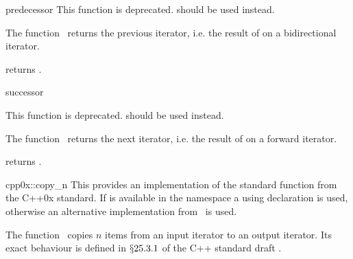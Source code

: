 \begin{ccRefFunction}{predecessor}
  \label{sectionPredecessor}
  \label{sectionGenericFunctions}
  This function is deprecated.  should be used
  instead.
  

  \begin{ccDeprecated}
    \ccDefinition The function \ccRefName\ returns the previous iterator,
    i.e. the result of  on a bidirectional iterator.
    
  
    {returns .}
    
    \ccSeeAlso
  \end{ccDeprecated}
\end{ccRefFunction}

\begin{ccRefFunction}{successor}
  \label{sectionSuccessor}

  This function is deprecated.  should be used
  instead.

  \begin{ccDeprecated}
    \ccDefinition The function \ccRefName\ returns the next iterator, i.e.
    the result of  on a forward iterator.
  
  
    {returns .}
  
    \ccSeeAlso
  \end{ccDeprecated}
\end{ccRefFunction}


\begin{ccRefFunction}{cpp0x::copy_n}
  This provides an implementation of the standard function
   from the C++0x standard. If  is available
  in the  namespace a using declaration is used, otherwise
  an alternative implementation from \cgal\ is used.

  \ccDefinition The function \ccRefName\ copies $n$ items from an
  input iterator to an output iterator. Its exact behaviour is defined
  in $\mathsection 25.3.1$ of the C++ standard draft
  .

\end{ccRefFunction}

